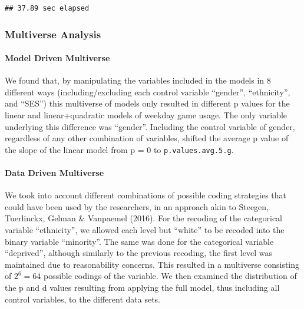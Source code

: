 \documentclass[floatsintext,man]{apa6}
\theoremstyle{definition}
\theoremstyle{definition}
\theoremstyle{definition}
\theoremstyle{remark}
\begin{document}
\begin{verbatim}
## 37.89 sec elapsed
\end{verbatim}

\hypertarget{multiverse-analysis}{%
\subsubsection{Multiverse Analysis}\label{multiverse-analysis}}

\hypertarget{model-driven-multiverse}{%
\paragraph{Model Driven Multiverse}\label{model-driven-multiverse}}

We found that, by manipulating the variables included in the models in 8
different ways (including/excluding each control variable
\enquote{gender}, \enquote{ethnicity}, and \enquote{SES}) this
multiverse of models only resulted in different p values for the linear
and linear+quadratic models of weekday game usage. The only variable
underlying this difference was \enquote{gender}. Including the control
variable of gender, regardless of any other combination of variables,
shifted the average p value of the slope of the linear model from p = 0
to \texttt{p.values.avg.5.g}.

\hypertarget{data-driven-multiverse}{%
\paragraph{Data Driven Multiverse}\label{data-driven-multiverse}}

We took into account different combinations of possible coding
strategies that could have been used by the researchers, in an approach
akin to Steegen, Tuerlinckx, Gelman \& Vanpaemel (2016). For the
recoding of the categorical variable \enquote{ethnicity}, we allowed
each level but \enquote{white} to be recoded into the binary variable
\enquote{minority}. The same was done for the categorical variable
\enquote{deprived}, although similarly to the previous recoding, the
first level was maintained due to reasonability concerns. This resulted
in a multiverse consisting of \(2^6 = 64\) possible codings of the
variable. We then examined the distribution of the p and d values
resulting from applying the full model, thus including all control
variables, to the different data sets.
\end{document}
